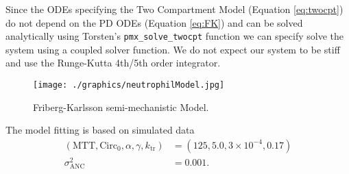 \documentclass[12pt, reqno, oneside]{amsbook}
\numberwithin{equation}{chapter}
\numberwithin{figure}{chapter}
\numberwithin{table}{chapter}
\theoremstyle{remark}
\begin{document}
Since the ODEs specifying the Two Compartment Model
(Equation \eqref{eq:twocpt}) do not depend on the PD ODEs
(Equation \eqref{eq:FK}) and can be solved analytically
using Torsten's \texttt{pmx_solve_twocpt} function
we can specify solve the system using a coupled solver function. We do not
expect our system to be stiff and use the Runge-Kutta 4th/5th order
integrator.

\begin{figure}[htbp]
\centering
\texttt{[image: ./graphics/neutrophilModel.jpg]}
\caption{\label{fig:FK_model}Friberg-Karlsson semi-mechanistic Model.}
\end{figure}


The model fitting is based on simulated data
\begin{align*}
  (\text{MTT}, \text{Circ}_{0}, \alpha, \gamma, k_{\text{tr}})& = (125, 5.0, 3 \times 10^{-4}, 0.17) \\
  \sigma^2_{\text{ANC}}& = 0.001.
\end{align*}
\end{document}

